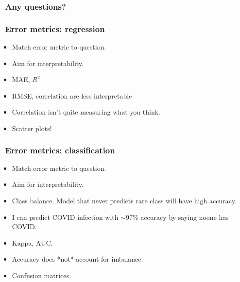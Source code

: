 \documentclass[handout, aspectratio = 169]{beamer}
\begin{document}
\begin{frame}
\frametitle{\insertframenumber~Any questions?}


\end{frame} 




\begin{frame}
\frametitle{\insertframenumber~Error metrics: regression}

\begin{itemize}
\item Match error metric to question.
\item Aim for interpretability.
\item MAE, $R^2$
\item RMSE, correlation are less interpretable
\item Correlation isn't quite measuring what you think.
\item Scatter plots!
\end{itemize}
\end{frame} 


\begin{frame}
\frametitle{\insertframenumber~Error metrics: classification}

\begin{itemize}
\item Match error metric to question.
\item Aim for interpretability.
\item Class balance. Model that never predicts rare class will have high accuracy.
\item I can predict COVID infection with $\sim$97\% accuracy by saying noone has COVID. 
\item Kappa, AUC.
\item Accuracy does *not* account for imbalance.
\item Confusion matrices.
\end{itemize}
\end{frame} 
\end{document}
